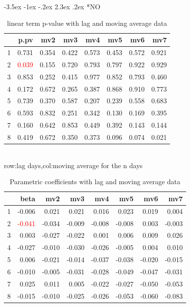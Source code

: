 \documentclass[a4paper, 12pt]{article}
\makeatletter
\def\large{\fontsize{14}{20}\selectfont}
\renewcommand\subsection{\@startsection {subsection}{1}{\z@}%
                                   {-3.5ex \@plus -1ex \@minus -.2ex}%
                                   {2.3ex \@plus.2ex}%
                                   {\centering\normalfont\large\bfseries}}
\makeatother
\begin{document}
\subsection*{NO}
\begin{table}[h]
\centering
\caption{linear term p-value with lag and moving average data}
\begin{tabular}{rrrrrrrr}
  \hline
 & p.pv & mv2 & mv3 & mv4 & mv5 & mv6 & mv7 \\
  \hline
1 & 0.731 & 0.354 & 0.422 & 0.573 & 0.453 & 0.572 & 0.921 \\
  2 & \textcolor{red}{0.039} & 0.155 & 0.720 & 0.793 & 0.797 & 0.922 & 0.929 \\
  3 & 0.853 & 0.252 & 0.415 & 0.977 & 0.852 & 0.793 & 0.460 \\
  4 & 0.172 & 0.672 & 0.265 & 0.387 & 0.868 & 0.910 & 0.773 \\
  5 & 0.739 & 0.370 & 0.587 & 0.207 & 0.239 & 0.558 & 0.683 \\
  6 & 0.593 & 0.832 & 0.251 & 0.342 & 0.130 & 0.169 & 0.395 \\
  7 & 0.160 & 0.642 & 0.853 & 0.449 & 0.392 & 0.143 & 0.144 \\
  8 & 0.419 & 0.672 & 0.350 & 0.373 & 0.096 & 0.074 & 0.021 \\
   \hline
\end{tabular}
\\row:lag days,col:moving average for the n days
\end{table}

\begin{table}[h]
\centering
\caption{Parametric coefficients with lag and moving average data}
\begin{tabular}{rrrrrrrr}
  \hline
 & beta & mv2 & mv3 & mv4 & mv5 & mv6 & mv7 \\
  \hline
1 & -0.006 & 0.021 & 0.021 & 0.016 & 0.023 & 0.019 & 0.004 \\
  2 & \textcolor{red}{-0.041} & -0.034 & -0.009 & -0.008 & -0.008 & 0.003 & -0.003 \\
  3 & 0.003 & -0.027 & -0.022 & 0.001 & 0.006 & 0.009 & 0.026 \\
  4 & -0.027 & -0.010 & -0.030 & -0.026 & -0.005 & 0.004 & 0.010 \\
  5 & 0.006 & -0.021 & -0.014 & -0.037 & -0.038 & -0.020 & -0.015 \\
  6 & -0.010 & -0.005 & -0.031 & -0.028 & -0.049 & -0.047 & -0.031 \\
  7 & 0.025 & 0.011 & 0.005 & -0.022 & -0.027 & -0.050 & -0.053 \\
  8 & -0.015 & -0.010 & -0.025 & -0.026 & -0.053 & -0.060 & -0.083 \\
   \hline
\end{tabular}
\end{table}
\clearpage
\end{document}
